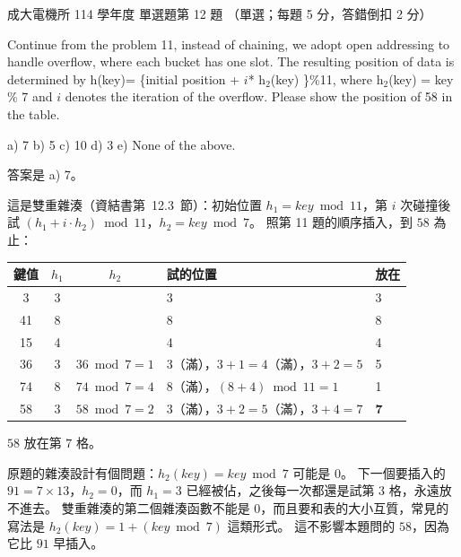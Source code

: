 \begin{pastexam}[label={px:ncku-114-ee-ds-12}]{成大電機所 114 學年度 單選題第 12 題}
（單選；每題 5 分，答錯倒扣 2 分）

Continue from the problem 11, instead of chaining, we adopt open addressing to handle overflow,
where each bucket has one slot. The resulting position of data is determined by h(key)=
\{initial position + $i$* h$_2$(key) \}\%11, where h$_2$(key) = key \% 7 and $i$ denotes the
iteration of the overflow. Please show the position of 58 in the table.

a) 7 \quad b) 5 \quad c) 10 \quad d) 3 \quad e) None of the above.
\end{pastexam}

\begin{pastsoln}
答案是 a) 7。

這是雙重雜湊（資結書第~12.3~節）：初始位置 $h_1 = \mathit{key} \bmod 11$，第 $i$ 次碰撞後試
$(h_1 + i \cdot h_2) \bmod 11$，$h_2 = \mathit{key} \bmod 7$。 照第 11 題的順序插入，到 $58$ 為止：
\begin{center}
\begin{tabular}{cccll}
\toprule
鍵值 & $h_1$ & $h_2$ & 試的位置 & 放在 \\
\midrule
3 & 3 & & 3 & 3 \\
41 & 8 & & 8 & 8 \\
15 & 4 & & 4 & 4 \\
36 & 3 & $36 \bmod 7 = 1$ & 3（滿），$3 + 1 = 4$（滿），$3 + 2 = 5$ & 5 \\
74 & 8 & $74 \bmod 7 = 4$ & 8（滿），$(8 + 4) \bmod 11 = 1$ & 1 \\
58 & 3 & $58 \bmod 7 = 2$ & 3（滿），$3 + 2 = 5$（滿），$3 + 4 = 7$ & \textbf{7} \\
\bottomrule
\end{tabular}
\end{center}
$58$ 放在第 $7$ 格。

原題的雜湊設計有個問題：$h_2(\mathit{key}) = \mathit{key} \bmod 7$ 可能是 $0$。 下一個要插入的
$91 = 7 \times 13$，$h_2 = 0$，而 $h_1 = 3$ 已經被佔，之後每一次都還是試第 $3$ 格，永遠放不進去。
雙重雜湊的第二個雜湊函數不能是 $0$，而且要和表的大小互質，常見的寫法是
$h_2(\mathit{key}) = 1 + (\mathit{key} \bmod 7)$ 這類形式。 這不影響本題問的 $58$，因為它比 $91$
早插入。
\end{pastsoln}
